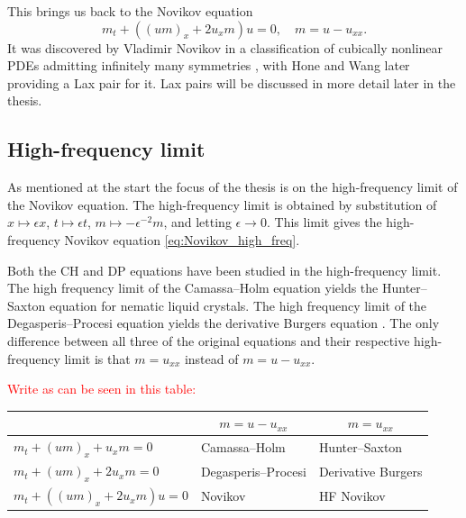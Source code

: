 \documentclass[english,master]{liumaiex}
\theoremstyle{plain}
\theoremstyle{definition}
\newcommand\todo[1]{\textcolor{red}{#1}}
\begin{document}
This brings us back to the Novikov equation
\begin{equation} \label{eq:Novikov_high_freq}
	m_t + ((um)_x + 2u_xm) u = 0,\quad m = u - u_{xx}.
\end{equation}
It was discovered by Vladimir Novikov in a classification of cubically nonlinear PDEs admitting infinitely many symmetries \cite{Novikov_2009}, with Hone and Wang \cite{Hone2008} later providing a Lax pair for it. Lax pairs will be discussed in more detail later in the thesis.

\subsection{High-frequency limit}

As mentioned at the start the focus of the thesis is on the high-frequency limit of the Novikov equation. The high-frequency limit is obtained by substitution of $x \mapsto \epsilon x$, $t \mapsto \epsilon t$, $m \mapsto -\epsilon^{-2} m$, and letting $\epsilon \rightarrow 0$. This limit gives the high-frequency Novikov equation \eqref{eq:Novikov_high_freq}.

Both the CH and DP equations have been studied in the high-frequency limit.  The high frequency limit of the Camassa--Holm equation yields the Hunter--Saxton equation \cite{HunterSaxton_1991,HunterZheng1994} for nematic liquid crystals. The high frequency limit of the Degasperis--Procesi equation yields the derivative Burgers equation \cite{Kohlenberg_2007, Lundmark_2008}.  The only difference between all three of the original equations and their respective high-frequency limit is that $m = u_{xx}$ instead of $m = u - u_{xx}$.

\todo{Write as can be seen in this table:}
\begin{center}
  \begin{tabular}{l|c|c}
    & $m=u-u_{xx}$ & $m=u_{xx}$ \\
    \hline
    $m_t + (um)_x + u_xm = 0$ 
	& \multicolumn{1}{l|}{Camassa--Holm} & \multicolumn{1}{l}{Hunter--Saxton} \\
    \hline
    $m_t + (um)_x + 2u_xm = 0$ 
	& \multicolumn{1}{l|}{Degasperis--Procesi} & \multicolumn{1}{l}{Derivative Burgers} \\
    \hline
    $m_t + ((um)_x + 2u_xm)u = 0$ 
	& \multicolumn{1}{l|}{Novikov} & \multicolumn{1}{l}{HF Novikov} \\
  \end{tabular}
\end{center}
\end{document}
